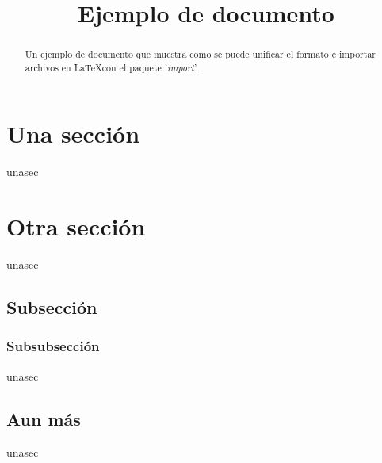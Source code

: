 \documentclass{article}
\title{Ejemplo de documento}
\begin{document}
\maketitle
\begin{abstract}
Un ejemplo de documento que muestra como se puede unificar el formato e importar archivos en \LaTeX con el paquete '\emph{import}'.
\end{abstract}

\section{Una sección}
  {unasec}

\section{Otra sección}
  {unasec}

  \subsection{Subsección}
    \subsubsection{Subsubsección}
      {unasec}

  \subsection{Aun más}
    {unasec}



\end{document}
